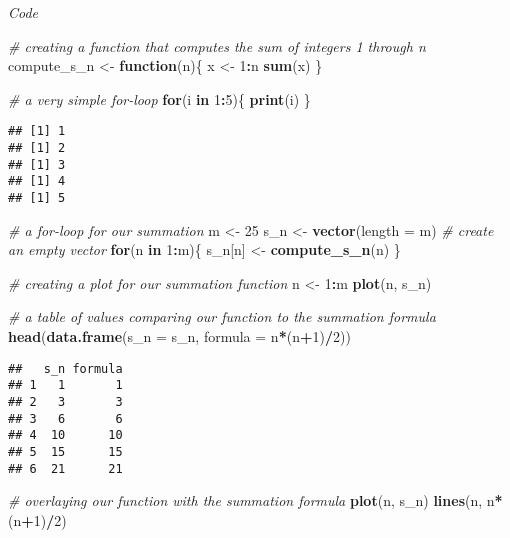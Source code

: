 \documentclass[]{article}
\newenvironment{Shaded}{\begin{snugshade}}{\end{snugshade}}
\newcommand{\CommentTok}[1]{\textcolor[rgb]{0.56,0.35,0.01}{\textit{#1}}}
\newcommand{\ControlFlowTok}[1]{\textcolor[rgb]{0.13,0.29,0.53}{\textbf{#1}}}
\newcommand{\DataTypeTok}[1]{\textcolor[rgb]{0.13,0.29,0.53}{#1}}
\newcommand{\DecValTok}[1]{\textcolor[rgb]{0.00,0.00,0.81}{#1}}
\newcommand{\KeywordTok}[1]{\textcolor[rgb]{0.13,0.29,0.53}{\textbf{#1}}}
\newcommand{\NormalTok}[1]{#1}
\newcommand{\OperatorTok}[1]{\textcolor[rgb]{0.81,0.36,0.00}{\textbf{#1}}}
\newcommand{\StringTok}[1]{\textcolor[rgb]{0.31,0.60,0.02}{#1}}
\begin{document}
\emph{Code}

\begin{Shaded}
\begin{Highlighting}[]
\CommentTok{# creating a function that computes the sum of integers 1 through n}
\NormalTok{compute_s_n <-}\StringTok{ }\ControlFlowTok{function}\NormalTok{(n)\{}
\NormalTok{  x <-}\StringTok{ }\DecValTok{1}\OperatorTok{:}\NormalTok{n}
  \KeywordTok{sum}\NormalTok{(x)}
\NormalTok{\}}

\CommentTok{# a very simple for-loop}
\ControlFlowTok{for}\NormalTok{(i }\ControlFlowTok{in} \DecValTok{1}\OperatorTok{:}\DecValTok{5}\NormalTok{)\{}
  \KeywordTok{print}\NormalTok{(i)}
\NormalTok{\}}
\end{Highlighting}
\end{Shaded}

\begin{verbatim}
## [1] 1
## [1] 2
## [1] 3
## [1] 4
## [1] 5
\end{verbatim}

\begin{Shaded}
\begin{Highlighting}[]
\CommentTok{# a for-loop for our summation}
\NormalTok{m <-}\StringTok{ }\DecValTok{25}
\NormalTok{s_n <-}\StringTok{ }\KeywordTok{vector}\NormalTok{(}\DataTypeTok{length =}\NormalTok{ m) }\CommentTok{# create an empty vector}
\ControlFlowTok{for}\NormalTok{(n }\ControlFlowTok{in} \DecValTok{1}\OperatorTok{:}\NormalTok{m)\{}
\NormalTok{  s_n[n] <-}\StringTok{ }\KeywordTok{compute_s_n}\NormalTok{(n)}
\NormalTok{\}}

\CommentTok{# creating a plot for our summation function}
\NormalTok{n <-}\StringTok{ }\DecValTok{1}\OperatorTok{:}\NormalTok{m}
\KeywordTok{plot}\NormalTok{(n, s_n)}

\CommentTok{# a table of values comparing our function to the summation formula}
\KeywordTok{head}\NormalTok{(}\KeywordTok{data.frame}\NormalTok{(}\DataTypeTok{s_n =}\NormalTok{ s_n, }\DataTypeTok{formula =}\NormalTok{ n}\OperatorTok{*}\NormalTok{(n}\OperatorTok{+}\DecValTok{1}\NormalTok{)}\OperatorTok{/}\DecValTok{2}\NormalTok{))}
\end{Highlighting}
\end{Shaded}

\begin{verbatim}
##   s_n formula
## 1   1       1
## 2   3       3
## 3   6       6
## 4  10      10
## 5  15      15
## 6  21      21
\end{verbatim}

\begin{Shaded}
\begin{Highlighting}[]
\CommentTok{# overlaying our function with the summation formula}
\KeywordTok{plot}\NormalTok{(n, s_n)}
\KeywordTok{lines}\NormalTok{(n, n}\OperatorTok{*}\NormalTok{(n}\OperatorTok{+}\DecValTok{1}\NormalTok{)}\OperatorTok{/}\DecValTok{2}\NormalTok{)}
\end{Highlighting}
\end{Shaded}
\end{document}
